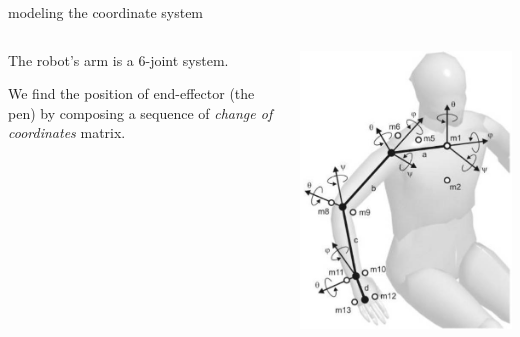 \documentclass{beamer}
\begin{document}
\begin{frame}[allowframebreaks]{modeling the coordinate system}

\begin{columns}
\begin{column}{0.5\textwidth}
\justify
   The robot's arm is a 6-joint system. 
   
   We find the position of end-effector (the pen) by composing a sequence of \emph{change of coordinates} matrix.
\end{column}
\begin{column}{0.5\textwidth}  %
    \begin{center}
     \includegraphics[scale = 0.35]{arm.jpg}\cite{3}
     \end{center}
\end{column}
\end{columns}





\end{frame}
\end{document}
